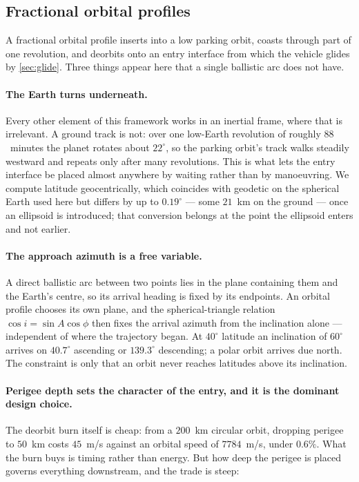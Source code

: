 \documentclass[11pt,a4paper]{article}
\theoremstyle{definition}
\numberwithin{equation}{section}
\begin{document}
\subsection{Fractional orbital profiles}
\label{sec:fobs}

A fractional orbital profile inserts into a low parking orbit, coasts through part of one revolution, and deorbits onto an entry interface from which the vehicle glides by \cref{sec:glide}. Three things appear here that a single ballistic arc does not have.

\paragraph{The Earth turns underneath.} Every other element of this framework works in an inertial frame, where that is irrelevant. A ground track is not: over one low-Earth revolution of roughly $88$~minutes the planet rotates about $22^\circ$, so the parking orbit's track walks steadily westward and repeats only after many revolutions. This is what lets the entry interface be placed almost anywhere by waiting rather than by manoeuvring. We compute latitude geocentrically, which coincides with geodetic on the spherical Earth used here but differs by up to $0.19^\circ$ --- some $21$~km on the ground --- once an ellipsoid is introduced; that conversion belongs at the point the ellipsoid enters and not earlier.

\paragraph{The approach azimuth is a free variable.} A direct ballistic arc between two points lies in the plane containing them and the Earth's centre, so its arrival heading is fixed by its endpoints. An orbital profile chooses its own plane, and the spherical-triangle relation $\cos i = \sin A \cos\phi$ then fixes the arrival azimuth from the inclination alone --- independent of where the trajectory began. At $40^\circ$ latitude an inclination of $60^\circ$ arrives on $40.7^\circ$ ascending or $139.3^\circ$ descending; a polar orbit arrives due north. The constraint is only that an orbit never reaches latitudes above its inclination.

\paragraph{Perigee depth sets the character of the entry, and it is the dominant design choice.} The deorbit burn itself is cheap: from a $200$~km circular orbit, dropping perigee to $50$~km costs $45$~m/s against an orbital speed of $7784$~m/s, under $0.6\%$. What the burn buys is timing rather than energy. But how deep the perigee is placed governs everything downstream, and the trade is steep:
\end{document}
